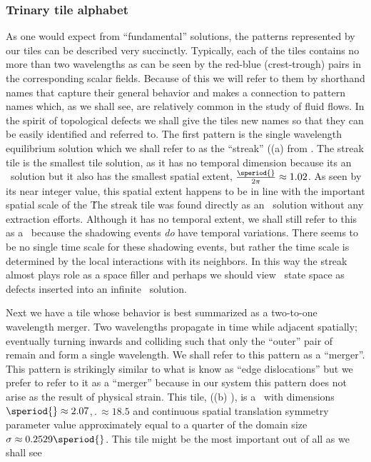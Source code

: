 \subsubsection{Trinary tile alphabet}
As one would expect from ``fundamental'' solutions,
the patterns represented by our
tiles can be described very succinctly.
Typically, each of the tiles contains no more than two
wavelengths as can be seen by the red-blue
(crest-trough) pairs in the corresponding scalar fields.
Because of this we will refer to them by shorthand
names that capture their general behavior and
makes a connection to pattern names which, as we shall see,
are relatively common in the study of fluid flows.
In the spirit of topological defects we
shall give the tiles new names so that they can be easily
identified and referred to.
The first pattern is the single
wavelength equilibrium solution which we shall
refer to as the ``streak'' ((a) from .
The streak tile
is the smallest tile solution, as it has no temporal
dimension because its an \eqv\ solution
but it also has the smallest spatial extent,
$\frac{\speriod{}}{2\pi} \approx 1.02$. As seen
by its near integer value, this spatial extent
happens to be in line with the important spatial
scale of the \KSe\. The streak tile was found
directly as an \eqv\ solution without any extraction efforts.
Although it has no temporal extent, we shall still refer
to this as a \twot\ because the shadowing events \textit{do}
have temporal variations. There seems to be no single time
scale for these shadowing events, but rather the time
scale is determined by the local interactions with its neighbors.
In this way the streak almost plays role as a space filler and
perhaps we should view \spt\ state space as defects inserted into
an infinite \eqv\ solution.

Next we have a tile whose behavior is best
summarized as a two-to-one wavelength merger. Two
wavelengths propagate in time while adjacent spatially;
eventually turning inwards and colliding such that only the
``outer'' pair of remain and form a single wavelength.
We shall refer to this pattern as a ``merger''. This
pattern is strikingly similar to what is know as ``edge
dislocations'' but we prefer to refer to
it as a ``merger'' because in our system this pattern
does not arise as the result of physical strain.
This tile,
((b) ), is a \twot\ with dimensions
$\speriod{}\approx 2.07$,$\period{} \approx 18.5$ and
continuous spatial translation symmetry parameter value
approximately equal to a quarter of the domain size
$\sigma \approx 0.2529 \speriod{}$. This tile might
be the most important out of all as we shall see

